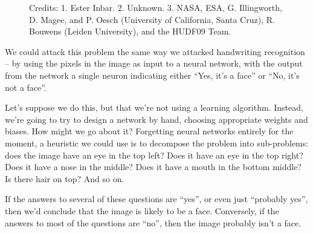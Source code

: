\documentclass[a4paper,twoside,10pt]{book}
\begin{document}
\begin{figure}
	\caption{Credits: 1. Ester Inbar. 2. Unknown. 3. NASA, ESA, G. Illingworth, D. Magee, and P. Oesch (University of California, Santa Cruz), R. Bouwens (Leiden University), and the HUDF09 Team.}
\end{figure}
We could attack this problem the same way we attacked handwriting recognition -- by using the pixels in the image as input to a neural network, with the output from the network a single neuron indicating either ``Yes, it's a face'' or ``No, it's not a face''.

Let's suppose we do this, but that we're not using a learning algorithm. Instead, we're going to try to design a network by hand, choosing appropriate weights and biases. How might we go about it? Forgetting neural networks entirely for the moment, a heuristic we could use is to decompose the problem into sub-problems: does the image have an eye in the top left? Does it have an eye in the top right? Does it have a nose in the middle? Does it have a mouth in the bottom middle? Is there hair on top? And so on.

If the answers to several of these questions are ``yes'', or even just ``probably yes'', then we'd conclude that the image is likely to be a face. Conversely, if the answers to most of the questions are ``no'', then the image probably isn't a face.
\end{document}
